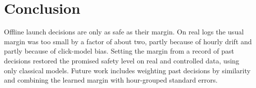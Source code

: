 \documentclass[conference]{IEEEtran}
\begin{document}
\section{Conclusion}
Offline launch decisions are only as safe as their margin. On real logs the usual margin was too small by a factor of about two, partly because of hourly drift and partly because of click-model bias. Setting the margin from a record of past decisions restored the promised safety level on real and controlled data, using only classical models. Future work includes weighting past decisions by similarity and combining the learned margin with hour-grouped standard errors.



\end{document}
